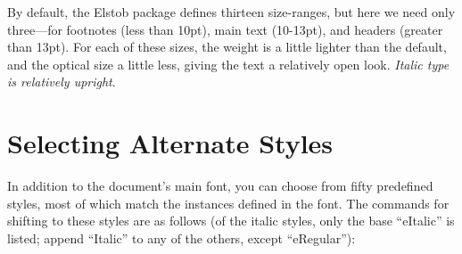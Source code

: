 \documentclass[12pt]{article}
\begin{document}
\noindent By default, the Elstob package defines thirteen size-ranges, but here we
need only three---for footnotes (less than 10pt),
main text (10-13pt), and headers (greater than 13pt). For each of these sizes, the
weight is a little lighter than the default, and the optical size a little less, giving
the text a relatively open look. \textit{Italic type is relatively upright}.

\section{Selecting Alternate Styles}

In addition to the document's main font, you can choose from fifty
predefined styles, most of which match the instances defined in the font.
The commands for shifting to these
styles are as follows (of the italic styles, only the base “eItalic” is listed;
append “Italic” to any of the others, except “eRegular”):
\end{document}
